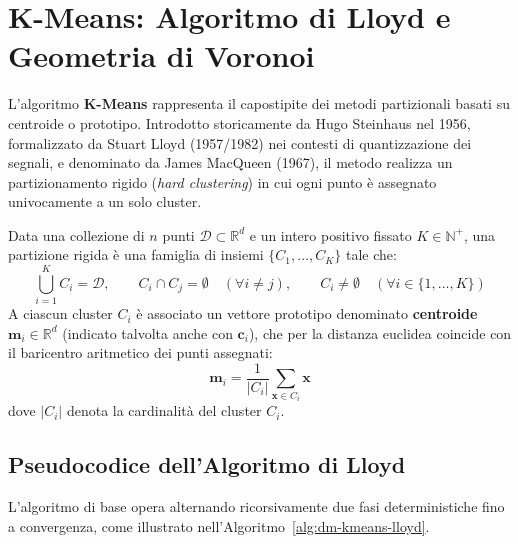 \FloatBarrier
\section{K-Means: Algoritmo di Lloyd e Geometria di Voronoi}
\label{sec:dm-kmeans-algorithm-geometry}

L'algoritmo \textbf{K-Means} rappresenta il capostipite dei metodi partizionali basati su centroide o prototipo. Introdotto storicamente da Hugo Steinhaus nel 1956, formalizzato da Stuart Lloyd (1957/1982) nei contesti di quantizzazione dei segnali, e denominato da James MacQueen (1967), il metodo realizza un partizionamento rigido (\textit{hard clustering}) in cui ogni punto è assegnato univocamente a un solo cluster.

\begin{definition}
Data una collezione di $n$ punti $\mathcal{D} \subset \mathbb{R}^d$ e un intero positivo fissato $K \in \mathbb{N}^+$, una partizione rigida è una famiglia di insiemi $\{C_1, \dots, C_K\}$ tale che:
\begin{equation}
    \bigcup_{i=1}^K C_i = \mathcal{D}, \qquad C_i \cap C_j = \emptyset \quad (\forall i \ne j), \qquad C_i \ne \emptyset \quad (\forall i \in \{1, \dots, K\})
\end{equation}
A ciascun cluster $C_i$ è associato un vettore prototipo denominato \textbf{centroide} $\mathbf{m}_i \in \mathbb{R}^d$ (indicato talvolta anche con $\mathbf{c}_i$), che per la distanza euclidea coincide con il baricentro aritmetico dei punti assegnati:
\begin{equation}
    \mathbf{m}_i = \frac{1}{|C_i|} \sum_{\mathbf{x} \in C_i} \mathbf{x}
    \label{eq:dm-centroid-definition}
\end{equation}
dove $|C_i|$ denota la cardinalità del cluster $C_i$.
\end{definition}

\FloatBarrier
\subsection{Pseudocodice dell'Algoritmo di Lloyd}

L'algoritmo di base opera alternando ricorsivamente due fasi deterministiche fino a convergenza, come illustrato nell'Algoritmo~\ref{alg:dm-kmeans-lloyd}.

